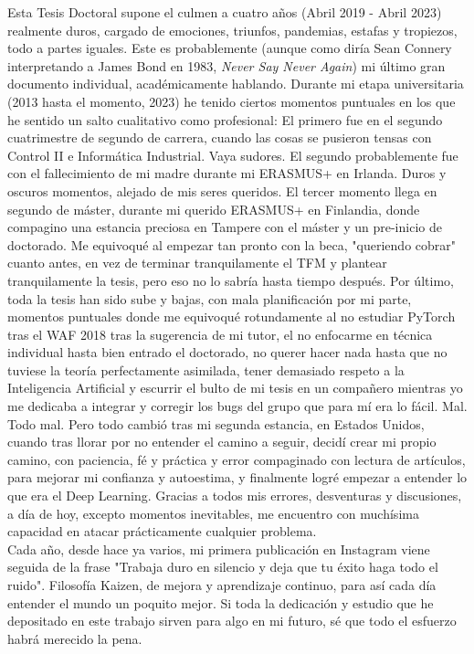 Esta Tesis Doctoral supone el culmen a cuatro años (Abril 2019 - Abril 2023) realmente duros, cargado de emociones, triunfos, pandemias, estafas y tropiezos, todo a partes iguales. Este es probablemente (aunque como diría Sean Connery interpretando a James Bond en 1983, \textit{Never Say Never Again}) mi último gran documento individual, académicamente hablando. Durante mi etapa universitaria (2013 hasta el momento, 2023) he tenido ciertos momentos puntuales en los que he sentido un salto cualitativo como profesional: El primero fue en el segundo cuatrimestre de segundo de carrera, cuando las cosas se pusieron tensas con Control II e Informática Industrial. Vaya sudores. El segundo probablemente fue con el fallecimiento de mi madre durante mi ERASMUS+ en Irlanda. Duros y oscuros momentos, alejado de mis seres queridos. El tercer momento llega en segundo de máster, durante mi querido ERASMUS+ en Finlandia, donde compagino una estancia preciosa en Tampere con el máster y un pre-inicio de doctorado. Me equivoqué al empezar tan pronto con la beca, "queriendo cobrar" cuanto antes, en vez de terminar tranquilamente el TFM y plantear tranquilamente la tesis, pero eso no lo sabría hasta tiempo después. Por último, toda la tesis han sido sube y bajas, con mala planificación por mi parte, momentos puntuales donde me equivoqué rotundamente al no estudiar PyTorch tras el WAF 2018 tras la sugerencia de mi tutor, el no enfocarme en técnica individual hasta bien entrado el doctorado, no querer hacer nada hasta que no tuviese la teoría perfectamente asimilada, tener demasiado respeto a la Inteligencia Artificial y escurrir el bulto de mi tesis en un compañero mientras yo me dedicaba a integrar y corregir los bugs del grupo que para mí era lo fácil. Mal. Todo mal. Pero todo cambió tras mi segunda estancia, en Estados Unidos, cuando tras llorar por no entender el camino a seguir, decidí crear mi propio camino, con paciencia, fé y práctica y error compaginado con lectura de artículos, para mejorar mi confianza y autoestima, y finalmente logré empezar a entender lo que era el Deep Learning. Gracias a todos mis errores, desventuras y discusiones, a día de hoy, excepto momentos inevitables, me encuentro con muchísima capacidad en atacar prácticamente cualquier problema. \\

Cada año, desde hace ya varios, mi primera publicación en Instagram viene seguida de la frase "Trabaja duro en silencio y deja que tu éxito haga todo el ruido". Filosofía Kaizen, de mejora y aprendizaje continuo, para así cada día entender el mundo un poquito mejor. Si toda la dedicación y estudio que he depositado en este trabajo sirven para algo en mi futuro, sé que todo el esfuerzo habrá merecido la pena. \\

